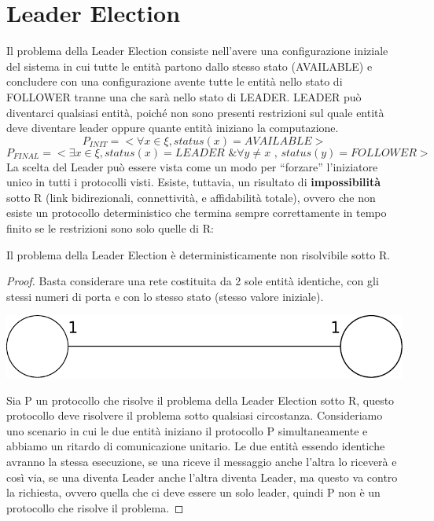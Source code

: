 \chapter{Leader Election}

Il problema della Leader Election consiste nell'avere una configurazione
iniziale del sistema in cui tutte le entità partono dallo stesso stato
(AVAILABLE) e concludere con una configurazione avente tutte le entità nello
stato di FOLLOWER tranne una che sarà nello stato di LEADER.
LEADER può diventarci qualsiasi entità, poiché non sono presenti restrizioni sul
quale entità deve diventare leader oppure quante entità iniziano la
computazione.
$$P_{INIT}=< \forall x \in \xi, status(x)=AVAILABLE >$$
$$P_{FINAL}=< \exists x \in \xi, status(x)=LEADER \text{ \& } \forall y \neq x
    \text{ , } status(y)=FOLLOWER >$$ La scelta del Leader può essere vista come un
modo per ``forzare'' l'iniziatore unico in tutti i protocolli visti. Esiste,
tuttavia, un risultato di \textbf{impossibilità} sotto R (link bidirezionali,
connettività, e affidabilità totale), ovvero che non esiste un protocollo
deterministico che termina sempre correttamente in tempo finito se le
restrizioni sono solo quelle di R:

\begin{theorem}
    Il problema della Leader Election è deterministicamente non
    risolvibile sotto R.
\end{theorem}

\begin{proof}
    Basta considerare una rete costituita da 2 sole entità identiche, con gli
    stessi numeri di porta e con lo stesso stato (stesso valore iniziale).

    \begin{center}
        \includegraphics[scale=0.3]{images/n_42}
    \end{center}
    Sia P un protocollo che risolve il problema della Leader Election sotto R,
    questo protocollo deve risolvere il problema sotto qualsiasi circostanza.
    Consideriamo uno scenario in cui le due entità iniziano il protocollo P
    simultaneamente e abbiamo un ritardo di comunicazione unitario. Le due
    entità essendo identiche avranno la stessa esecuzione, se una riceve il
    messaggio anche l'altra lo riceverà e così via, se una diventa Leader anche
    l'altra diventa Leader, ma questo va contro la richiesta, ovvero quella che
    ci deve essere un solo leader, quindi P non è un protocollo che risolve il
    problema.
\end{proof}


